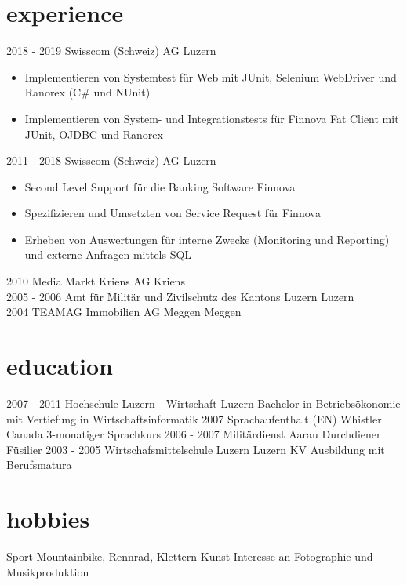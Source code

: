 \documentclass[]{cv-style} %
\begin{document}
\section{experience}
\begin{entrylist}
\entry
{2018 - 2019}
{Swisscom (Schweiz) AG}
{Luzern}
{
\begin{itemize}
  \item Implementieren von Systemtest für Web mit JUnit, Selenium WebDriver und Ranorex (C\# und NUnit)
  \item Implementieren von System- und Integrationstests für Finnova Fat Client mit JUnit, OJDBC und Ranorex
\end{itemize}
}
\entry
  {2011 - 2018}
  {Swisscom (Schweiz) AG}
  {Luzern}
  {
\begin{itemize}
  \item Second Level Support für die Banking Software Finnova 
  \item Spezifizieren und Umsetzten von Service Request für Finnova
  \item Erheben von Auswertungen für interne Zwecke (Monitoring und Reporting) und externe Anfragen mittels SQL
\end{itemize}
}
\entry
  {2010}
  {Media Markt Kriens AG}
  {Kriens}
  {}\\
\entry
  {2005 - 2006}
  {Amt für Militär und Zivilschutz des Kantons Luzern}
  {Luzern}
  {}\\
\entry
  {2004}
  {TEAMAG Immobilien AG Meggen}
  {Meggen}
  {}
\end{entrylist}
\section{education}
\begin{entrylist}
\entry
{2007 - 2011}
{Hochschule Luzern - Wirtschaft}
{Luzern}
{Bachelor in Betriebsökonomie mit Vertiefung in Wirtschaftsinformatik}
\entry
{2007}
{Sprachaufenthalt (EN)}
{Whistler Canada}
{3-monatiger Sprachkurs}
\entry
{2006 - 2007}
{Militärdienst}
{Aarau}
{Durchdiener Füsilier}
\entry
{2003 - 2005}
{Wirtschafsmittelschule Luzern}
{Luzern}
{KV Ausbildung mit Berufsmatura}
\end{entrylist} 
\section{hobbies}
\begin{entrylist}
\entry
{}
{Sport}
{}
{Mountainbike, Rennrad, Klettern}
\entry
{}
{Kunst}
{}
{Interesse an Fotographie und Musikproduktion}
\end{entrylist}
\end{document}
